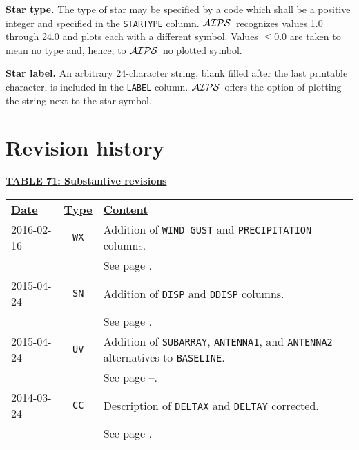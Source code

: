 \documentclass[twoside]{article}
\newcommand{\Hi}[1]{\textcolor{hicol}{#1}}
\newcommand{\AIPS}{{$\cal AIPS\/$}}
\begin{document}
{\bf Star type.} The type of star may be specified by a code which
shall be a positive integer and specified in the {\tt STARTYPE}
column.  \AIPS\ recognizes values 1.0 through 24.0 and plots each with
a different symbol.  Values $\leq 0.0$ are taken to mean no type and,
hence, to \AIPS\ no plotted symbol.

{\bf Star label.} An arbitrary 24-character string, blank filled after
the last printable character, is included in the {\tt LABEL} column.
\AIPS\ offers the option of plotting the string next to the star
symbol.

\vfill\eject
\section{\Hi{Revision history}}


\begin{center}
\Hi{\underline{\bf{TABLE 71: Substantive revisions}}}\\
\begin{tabular}{lcl}
\noalign{\vspace{6pt}} \label{ta:revisions}
\underline{{\bf Date\vphantom{y}}} & \underline{{\bf Type}} &
   \underline{{\bf Content\vphantom{y}}} \\
\noalign{\vspace{7pt}}
\Hi{2016-02-16} & \Hi{{\tt WX}} & \Hi{Addition of {\tt WIND\_GUST} and
                      {\tt PRECIPITATION} columns.}\\
           &          & \Hi{See page \pageref{s:WX}.} \\
\noalign{\vspace{4pt}}
\Hi{2015-04-24} & \Hi{{\tt SN}} & \Hi{Addition of {\tt DISP} and
                        {\tt DDISP} columns.}\\
           &          & \Hi{See page \pageref{s:SN}.} \\
\noalign{\vspace{4pt}}
\Hi{2015-04-24} & \Hi{{\tt UV}} & \Hi{Addition of {\tt SUBARRAY},
                  {\tt ANTENNA1}, and {\tt ANTENNA2} alternatives
                  to {\tt BASELINE}.} \\
    &          & \Hi{See page \pageref{RGranpar}--\pageref{TAranpar}.} \\
\noalign{\vspace{4pt}}
\Hi{2014-03-24} & \Hi{{\tt CC}} & \Hi{Description of {\tt DELTAX} and
                        {\tt DELTAY} corrected.} \\
           &          & \Hi{See page \pageref{s:CC}.} \\

\end{tabular}
\end{center}
\end{document}
